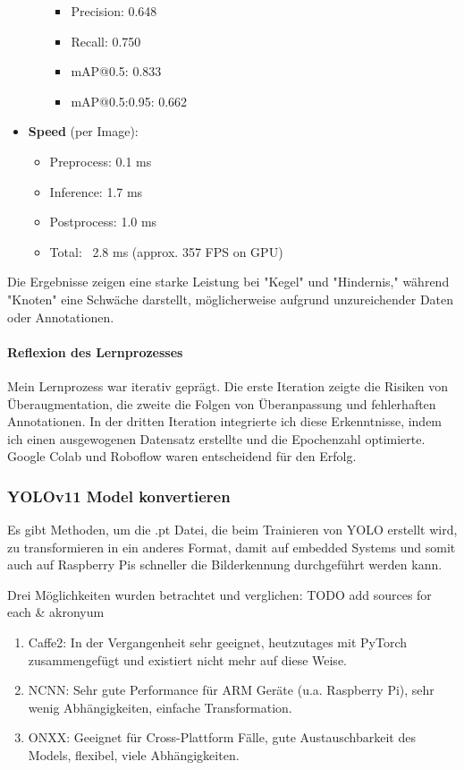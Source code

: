 \begin{itemize}
\begin{itemize}
\begin{itemize}
            \item Precision: 0.648
            \item Recall: 0.750
            \item mAP@0.5: 0.833
            \item mAP@0.5:0.95: 0.662
        \end{itemize}
    \end{itemize}
    \item \textbf{Speed} (per Image):
    \begin{itemize}
        \item Preprocess: 0.1 ms
        \item Inference: 1.7 ms
        \item Postprocess: 1.0 ms
        \item Total: ~2.8 ms (approx. 357 FPS on GPU)
    \end{itemize}
\end{itemize}


Die Ergebnisse zeigen eine starke Leistung bei "Kegel" und "Hindernis," während "Knoten" eine Schwäche darstellt, möglicherweise aufgrund unzureichender Daten oder Annotationen.

\paragraph{Reflexion des Lernprozesses}

Mein Lernprozess war iterativ geprägt. Die erste Iteration zeigte die Risiken von Überaugmentation, die zweite die Folgen von Überanpassung und fehlerhaften Annotationen. In der dritten Iteration integrierte ich diese Erkenntnisse, indem ich einen ausgewogenen Datensatz erstellte und die Epochenzahl optimierte. Google Colab und Roboflow waren entscheidend für den Erfolg.







\subsubsection{YOLOv11 Model konvertieren}
\label{convert-yolo}

Es gibt Methoden, um die .pt Datei, die beim Trainieren von YOLO erstellt wird, zu transformieren in ein anderes Format, damit auf embedded Systems und somit auch auf Raspberry Pis schneller die Bilderkennung durchgeführt werden kann.

Drei Möglichkeiten wurden betrachtet und verglichen:
TODO add sources for each \& akronyum
\begin{enumerate}
    \item Caffe2: In der Vergangenheit sehr geeignet, heutzutages mit PyTorch zusammengefügt und existiert nicht mehr auf diese Weise.
    \item NCNN: Sehr gute Performance für ARM Geräte (u.a. Raspberry Pi), sehr wenig Abhängigkeiten, einfache Transformation.
    \item ONXX: Geeignet für  Cross-Plattform Fälle, gute Austauschbarkeit des Models, flexibel, viele Abhängigkeiten.
\end{enumerate}

